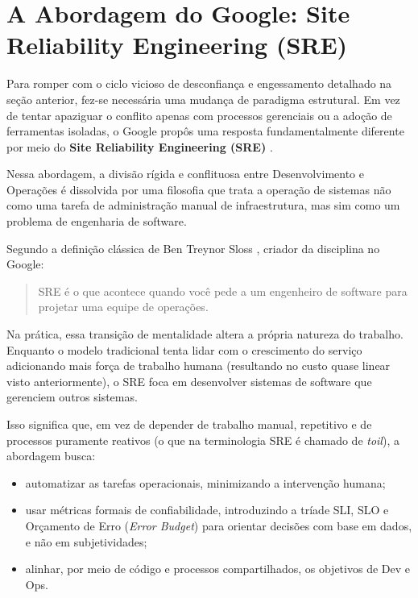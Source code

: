\documentclass[12pt,a4paper,twoside]{report}
\begin{document}
\section{A Abordagem do Google: Site Reliability Engineering (SRE)} 

Para romper com o ciclo vicioso de desconfiança e engessamento detalhado na seção anterior, fez-se necessária uma mudança de paradigma estrutural. Em vez de tentar apaziguar o conflito apenas com processos gerenciais ou a adoção de ferramentas isoladas, o Google propôs uma resposta fundamentalmente diferente por meio do \textbf{Site Reliability Engineering (SRE)} \cite{beyer2016sre, beyer2018workbook}.

Nessa abordagem, a divisão rígida e conflituosa entre Desenvolvimento e Operações é dissolvida por uma filosofia que trata a operação de sistemas não como uma tarefa de administração manual de infraestrutura, mas sim como um problema de engenharia de software.

Segundo a definição clássica de Ben Treynor Sloss \cite{beyer2016sre, beyer2018workbook}, criador da disciplina no Google:
\begin{quote}
SRE é o que acontece quando você pede a um engenheiro de software para
projetar uma equipe de operações.
\end{quote}

Na prática, essa transição de mentalidade altera a própria natureza do trabalho. Enquanto o modelo tradicional tenta lidar com o crescimento do serviço adicionando mais força de trabalho humana (resultando no custo quase linear visto anteriormente), o SRE foca em desenvolver sistemas de software que gerenciem outros sistemas.

Isso significa que, em vez de depender de trabalho manual, repetitivo e de processos puramente reativos (o que na terminologia SRE é chamado  de \emph{toil}), a abordagem busca:
\begin{itemize}[nosep]
    \item automatizar as tarefas operacionais, minimizando a intervenção humana;
    \item usar métricas formais de confiabilidade, introduzindo a tríade SLI, SLO e Orçamento de Erro (\emph{Error Budget}) para orientar decisões com base em dados, e não em subjetividades;
    \item alinhar, por meio de código e processos compartilhados, os objetivos de Dev e Ops.
\end{itemize}
\end{document}
